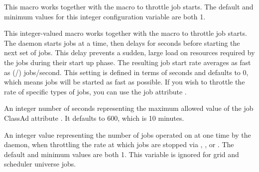 \begin{description}

  
\label{param:JobStartCount}
\item[\Macro{JOB\_START\_COUNT}]
  This macro works together with the  macro to
  throttle job starts.  The default and minimum values for this
  integer configuration variable are both 1.

\label{param:JobStartDelay}
\item[\Macro{JOB\_START\_DELAY}]
  This integer-valued macro works together with the
   macro
  to throttle job starts.  The   daemon starts
   jobs at a time, then delays for
   seconds before starting the next set of jobs.
  This delay prevents a sudden, large load on resources required by
  the jobs during their start up phase.
  The resulting job start rate
  averages as fast as
  (/) jobs/second.
  This setting is defined in terms of seconds and defaults to 0, which means
  jobs will be started as fast as possible.  If you wish to throttle
  the rate of specific types of jobs, you can use the job attribute
  .

\label{param:MaxNextJobStartDelay}
\item[\Macro{MAX\_NEXT\_JOB\_START\_DELAY}]
  An integer number of seconds representing the maximum allowed value
  of the job ClassAd attribute .  It defaults to 600,
  which is 10 minutes.

\label{param:JobStopCount}
\item[\Macro{JOB\_STOP\_COUNT}]
  An integer value representing the number of jobs operated on at one time
  by the  daemon, when throttling the rate at which jobs
  are stopped via , , or .  
  The default and minimum values are both 1.
  This variable is ignored for grid and scheduler universe jobs.


\end{description}
